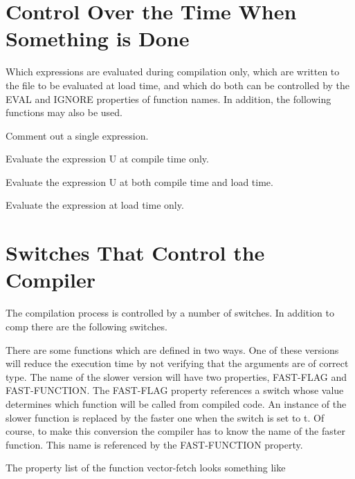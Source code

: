 \section{Control Over the Time When Something is Done}

  Which expressions are evaluated during compilation only, which
are written to the file to be evaluated at load time, and  which
do  both  can be controlled by the EVAL and IGNORE properties of
function names. In addition, the following functions may also be
used.


{        Comment out a single expression.
}

{    Evaluate the expression U at compile time only.
}

{    Evaluate the expression U at  both  compile  time  and  load
    time.
}

{    Evaluate the expression at load time only.
}
\section{Switches That Control the Compiler}

  The compilation process is controlled by a number of switches.
In addition to comp there are the following switches.

{}

{}

{}

{
    There  are some functions which are defined in two ways. One
    of these versions will reduce  the  execution  time  by  not
    verifying  that  the arguments are of correct type. The name
    of the slower version will have  two  properties,  FAST-FLAG
    and  FAST-FUNCTION.  The  FAST-FLAG  property  references  a
    switch whose value determines which function will be  called
    from  compiled  code.  An instance of the slower function is
    replaced by the faster one when the switch is set to  t.  Of
    course, to make this conversion the compiler has to know the
    name of the faster function.  This name is referenced by the
    FAST-FUNCTION property.
}

    The property list of the function vector-fetch looks something like

